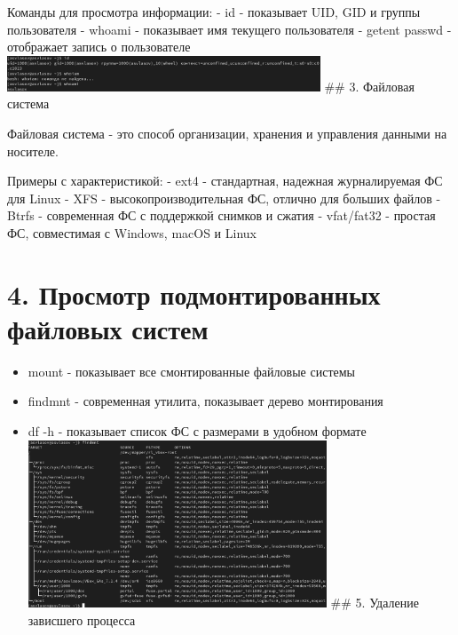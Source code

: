 \documentclass[
  12pt,
  a4paper,
  DIV=11,
  numbers=noendperiod]{scrreprt}
\providecommand{\tightlist}{%
  \setlength{\itemsep}{0pt}\setlength{\parskip}{0pt}}\usepackage{longtable,booktabs,array}
\begin{document}
Команды для просмотра информации: - id - показывает UID, GID и группы
пользователя - whoami - показывает имя текущего пользователя - getent
passwd - отображает запись о пользователе
\includegraphics[width=0.7\textwidth,height=\textheight]{image/25.png}
\#\# 3. Файловая система

Файловая система - это способ организации, хранения и управления данными
на носителе.

Примеры с характеристикой: - ext4 - стандартная, надежная журналируемая
ФС для Linux - XFS - высокопроизводительная ФС, отлично для больших
файлов - Btrfs - современная ФС с поддержкой снимков и сжатия -
vfat/fat32 - простая ФС, совместимая с Windows, macOS и Linux

\section{4. Просмотр подмонтированных файловых
систем}\label{ux43fux440ux43eux441ux43cux43eux442ux440-ux43fux43eux434ux43cux43eux43dux442ux438ux440ux43eux432ux430ux43dux43dux44bux445-ux444ux430ux439ux43bux43eux432ux44bux445-ux441ux438ux441ux442ux435ux43c}

\begin{itemize}
\tightlist
\item
  mount - показывает все смонтированные файловые системы
\item
  findmnt - современная утилита, показывает дерево монтирования
\item
  df -h - показывает список ФС с размерами в удобном формате
  \includegraphics[width=0.7\textwidth,height=\textheight]{image/26.png}
  \#\# 5. Удаление зависшего процесса
\end{itemize}
\end{document}

